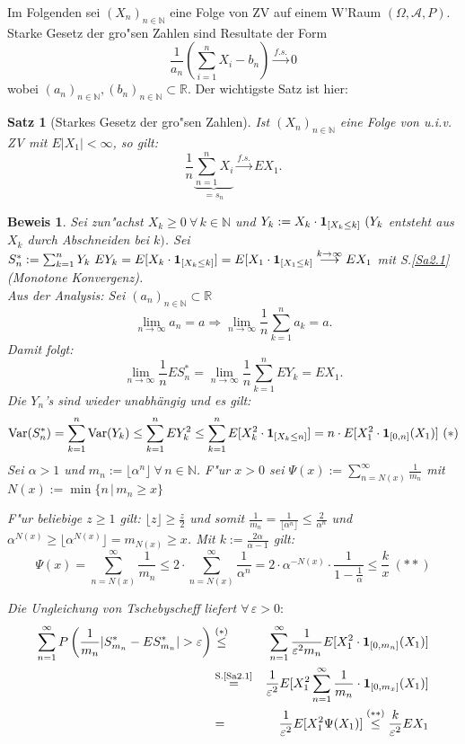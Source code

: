 \documentclass[a4paper,11pt]{book}
\newcommand{\R}{{\mathbb R}}
\newcommand{\N}{{\mathbb N}}
\newcommand{\ind}{\text{\bf{1}}}
\newcommand{\eps}{\varepsilon}
\DeclareMathOperator{\var}{Var}
\def\AA{ \mathcal{A} }
\def\fs{\stackrel{f.s.}{\rightarrow }}
\newtheorem{Sa}{Satz}[chapter]
\theoremstyle{nonumberplain}
\newtheorem{Bew}{Beweis}
\begin{document}
Im Folgenden sei $(X_n)_{n \in \N}$ eine Folge von ZV auf einem W'Raum $(\Omega,\AA,P)$. Starke Gesetz der gro"sen Zahlen sind Resultate der Form
\[
\frac1{a_n} \left( \sum_{i = 1}^{n} X_i -b_n \right) \fs 0
\]
wobei $(a_n)_{n \in \N}, (b_n)_{n \in \N} \subset \R$. Der wichtigste Satz ist hier:

\begin{Sa}[Starkes Gesetz der gro"sen Zahlen] \label{Sa4.2}
Ist $(X_n)_{n \in \N}$ eine Folge von u.i.v. ZV mit $E|X_1| < \infty$, so gilt:
\[
\frac1{n} \underbrace{\sum_{n=1}^n X_i}_{=s_n} \fs EX_1.
\]
\end{Sa}

\begin{Bew}
Sei zun"achst $X_k \geq 0\ \forall\, k \in \N$ und $Y_k := X_k \cdot \ind_{[X_k \leq k]}\ (Y_k$ entsteht aus $X_k$ durch Abschneiden bei $k)$. Sei $S_n^{\ast} := \sum_{k=1}^n Y_k\ EY_k = E[X_k \cdot \ind_{[X_k \leq k]}] = E[X_1 \cdot \ind_{[X_1 \leq k]} \stackrel{k \rightarrow \infty}{\longrightarrow} EX_1$ mit S.\ref{Sa2.1} (Monotone Konvergenz).\\
Aus der Analysis: Sei $(a_n)_{n \in \N} \subset \R$
\[
\lim_{n \rightarrow \infty} a_n = a \Rightarrow \lim_{n \rightarrow \infty} \frac1{n} \sum_{k=1}^n a_k = a.
\]
Damit folgt:
\[
\lim_{n \rightarrow \infty} \frac1{n} E S_n^{\ast} = \lim_{n \rightarrow \infty} \frac1{n} \sum_{k=1}^n E Y_k = E X_1.
\]
Die $Y_n$'s sind wieder unabhängig und es gilt:
\[
\var(S_n^{\ast}) = \sum_{k=1}^n \var(Y_k) \leq \sum_{k=1}^n EY_k^2 \leq \sum_{k=1}^n E[X_k^2 \cdot \ind_{[X_k \leq n]}] = n \cdot E[X_1^2 \cdot \ind_{[0,n]}(X_1)] \ (\ast)
\]
Sei $\alpha > 1$ und $m_n := \lfloor \alpha^n \rfloor \ \forall\, n \in \N$. F"ur $x > 0$ sei $\Psi(x) := \sum_{n = N(x)}^{\infty} \frac1{m_n}$ mit $N(x) := \min\{ n \, | \, m_n \geq x \}$

F"ur beliebige $z \geq 1$ gilt: $\lfloor z \rfloor \geq \frac{z}2$ und somit $\frac1{m_n} = \frac1{\lfloor \alpha^n \rfloor} \leq \frac2{\alpha^n}$ und $\alpha^{N(x)} \geq \lfloor \alpha^{N(x)} \rfloor = m_{N(x)} \geq x$. Mit $k := \frac{2\alpha}{\alpha-1}$ gilt:
\[
\Psi(x) = \sum_{n=N(x)}^{\infty} \frac1{m_n} \leq 2 \cdot \sum_{n=N(x)}^{\infty} \frac1{\alpha^n} = 2 \cdot \alpha^{-N(x)} \cdot \frac1{1-\frac1{\alpha}} \leq \frac{k}{x} \ (\ast \ast)
\]

Die Ungleichung von Tschebyscheff liefert $\forall\, \eps > 0:$
\begin{eqnarray*}
\sum_{n=1}^{\infty} P\left( \frac1{m_n} | S_{m_n}^{\ast} - E S_{m_n}^{\ast} | > \eps \right) & \stackrel{(\ast)}{\leq} & \sum_{n=1}^{\infty} \frac1{\eps^2 m_n} E[X_1^2 \cdot \ind_{[0,m_n]}(X_1)] \\
& \stackrel{\text{S.\ref{Sa2.1}}}{=} & \frac1{\eps^2} E[X_1^2 \sum_{n=1}^{\infty} \frac1{m_n} \cdot \ind_{[0,m_x]}(X_1)]\\
& = & \frac1{\eps^2} E[X_1^2 \Psi(X_1)] \stackrel{(\ast \ast)}{\leq} \frac{k}{\eps^2} EX_1
\end{eqnarray*}


\end{Bew}
\end{document}

